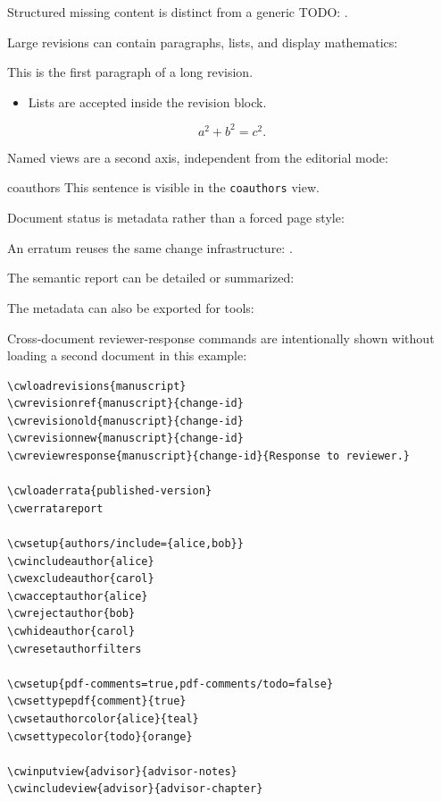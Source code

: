 \documentclass[11pt]{article}
\begin{document}
Structured missing content is distinct from a generic TODO:
.

Large revisions can contain paragraphs, lists, and display mathematics:

\begin{cwrevision}[id=large-revision,author=maria]
This is the first paragraph of a long revision.

\begin{itemize}
\item Lists are accepted inside the revision block.
\end{itemize}

\[
  a^2+b^2=c^2 .
\]
\end{cwrevision}

Named views are a second axis, independent from the editorial mode:

\begin{cwview}{coauthors}
This sentence is visible in the \texttt{coauthors} view.
\end{cwview}

Document status is metadata rather than a forced page style:

\cwshowdocumentstatus

An erratum reuses the same change infrastructure:
.

The semantic report can be detailed or summarized:
\cwreport[mode=summary]

The metadata can also be exported for tools:

Cross-document reviewer-response commands are intentionally shown without
loading a second document in this example:

\begin{verbatim}
\cwloadrevisions{manuscript}
\cwrevisionref{manuscript}{change-id}
\cwrevisionold{manuscript}{change-id}
\cwrevisionnew{manuscript}{change-id}
\cwreviewresponse{manuscript}{change-id}{Response to reviewer.}

\cwloaderrata{published-version}
\cwerratareport

\cwsetup{authors/include={alice,bob}}
\cwincludeauthor{alice}
\cwexcludeauthor{carol}
\cwacceptauthor{alice}
\cwrejectauthor{bob}
\cwhideauthor{carol}
\cwresetauthorfilters

\cwsetup{pdf-comments=true,pdf-comments/todo=false}
\cwsettypepdf{comment}{true}
\cwsetauthorcolor{alice}{teal}
\cwsettypecolor{todo}{orange}

\cwinputview{advisor}{advisor-notes}
\cwincludeview{advisor}{advisor-chapter}
\end{verbatim}
\end{document}
